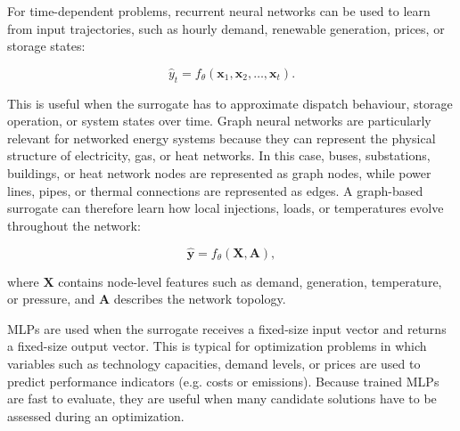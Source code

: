 \documentclass[final,5p,times,twocolumn]{elsarticle}
\begin{document}
For time-dependent problems, recurrent neural networks can be used to
learn from input trajectories, such as hourly demand, renewable
generation, prices, or storage states:

$$\begin{equation}
 \hat{y}_t = f_{\theta} \left( \mathbf{x}_1,\mathbf{x}_2,\ldots,\mathbf{x}_t \right).
\end{equation}$$

This is useful when the surrogate has to approximate dispatch behaviour,
storage operation, or system states over time. Graph neural networks are
particularly relevant for networked energy systems because they can
represent the physical structure of electricity, gas, or heat networks.
In this case, buses, substations, buildings, or heat network nodes are
represented as graph nodes, while power lines, pipes, or thermal
connections are represented as edges. A graph-based surrogate can
therefore learn how local injections, loads, or temperatures evolve
throughout the network:

$$\begin{equation}
 \hat{\mathbf{y}} = f_{\theta} \left( \mathbf{X}, \mathbf{A} \right),
\end{equation}$$

where $\mathbf{X}$ contains node-level features such as demand,
generation, temperature, or pressure, and $\mathbf{A}$ describes the
network topology.

MLPs are used when the surrogate receives a fixed-size input vector and
returns a fixed-size output vector. This is typical for optimization
problems in which variables such as technology capacities, demand
levels, or prices are used to predict performance indicators (e.g. costs
or emissions). Because trained MLPs are fast to evaluate, they are
useful when many candidate solutions have to be assessed during an
optimization.
\end{document}
